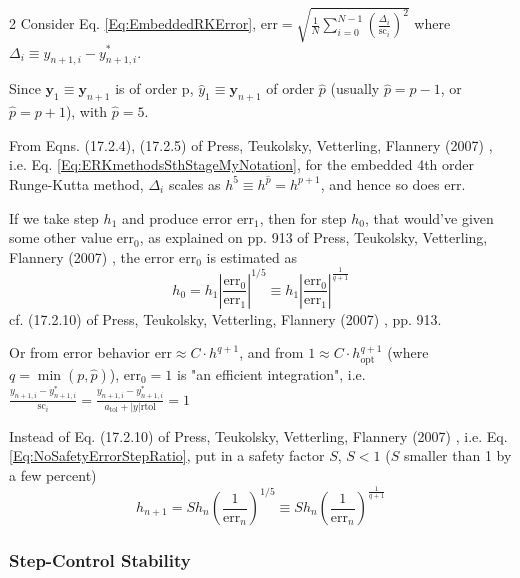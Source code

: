 \documentclass[10pt]{amsart}
\begin{document}
\begin{multicols*}{2}
Consider Eq. \ref{Eq:EmbeddedRKError}, $\text{err} = \sqrt{ \frac{1}{N} \sum_{i=0}^{N-1} \left( \frac{ \Delta_i}{ \text{sc}_i } \right)^2 }$ where $\Delta_i \equiv y_{n+1,i} - y^*_{n+1, i}$. 

Since $\mathbf{y}_1 \equiv \mathbf{y}_{n+1}$ is of order p, $\widehat{y}_1 \equiv \mathbf{y}_{n+1}$ of order $\widehat{p}$ (usually $\widehat{p} = p -1$, or $\widehat{p} = p+1$), with $\widehat{p} = 5$. 

From Eqns. (17.2.4), (17.2.5) of Press, Teukolsky, Vetterling, Flannery (2007) \cite{PTVF2007}, i.e. Eq. \ref{Eq:ERKmethodsSthStageMyNotation}, for the embedded 4th order Runge-Kutta method, $\Delta_i$ scales as $h^5 \equiv h^{\widehat{p}} = h^{p+1}$, and hence so does $\text{err}$.

If we take step $h_1$ and produce error $\text{err}_1$, then for step $h_0$, that would've given some other value $\text{err}_0$, as explained on pp. 913 of Press, Teukolsky, Vetterling, Flannery (2007) \cite{PTVF2007}, the error $\text{err}_0$ is estimated as
\begin{equation}\label{Eq:NoSafetyErrorStepRatio}
	h_0 = h_1 \left|\frac{ \text{err}_0 }{ \text{err}_1} \right|^{1/5} \equiv h_1 \left| \frac{ \text{err}_0}{ \text{err}_1 } \right|^{\frac{1}{q+1} }
\end{equation}
cf. (17.2.10) of Press, Teukolsky, Vetterling, Flannery (2007) \cite{PTVF2007}, pp. 913.

Or from error behavior $\text{err} \approx C \cdot h^{q+1}$, and from $1 \approx C \cdot h^{q+1}_{\text{opt}}$ (where $q= \min{(p, \widehat{p})}$), $\text{err}_0 =1$ is "an efficient integration", i.e. $\frac{ y_{n+1, i} - y^*_{n+1,i} }{ \text{sc}_i } = \frac{ y_{n+1, i} - y^*_{n+1, i} }{ a_{\text{tol}} + |y| \text{rtol} } = 1$

Instead of Eq. (17.2.10) of Press, Teukolsky, Vetterling, Flannery (2007) \cite{PTVF2007}, i.e. Eq. \ref{Eq:NoSafetyErrorStepRatio}, put in a safety factor $S$, $S<1$ ($S$ smaller than 1 by a few percent)
\begin{equation}\label{Eq:ScaleStepSizeWithSafety}
h_{n+1} = S h_n \left( \frac{1}{ \text{err}_n } \right)^{1/5} \equiv S h_n \left( \frac{1}{ \text{err}_n } \right)^{ \frac{1}{q+1} }
\end{equation}

\subsubsection{Step-Control Stability}


\end{multicols*}
\end{document}
